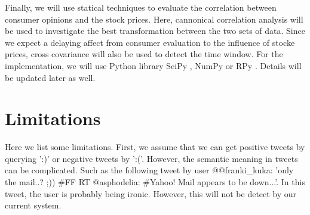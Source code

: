 \documentclass[12pt]{article}
\begin{document}
Finally, we will use statical techniques to evaluate the correlation between consumer opinions and the stock prices. Here, cannonical correlation analysis will be used to investigate the best transformation between the two sets of data. Since we expect a delaying affect from consumer evaluation to the influence of stocke prices, cross covariance will also be used to detect the time window. For the implementation, we will use Python library SciPy \cite{SciPy}, NumPy \cite{NumPy} or RPy \cite{RPy}. Details will be updated later as well.

\section{Limitations}
Here we list some limitations. First, we assume that we can get positive tweets by querying ':)' or negative tweets by ':('. However, the semantic meaning in tweets can be complicated. Such as the following tweet by user @@franki\_kuka: 'only the mail..? ;)) \#FF RT @asphodelia: \#Yahoo! Mail appears to be down...'. In this tweet, the user is probably being ironic. However, this will not be detect by our current system.



\end{document}

